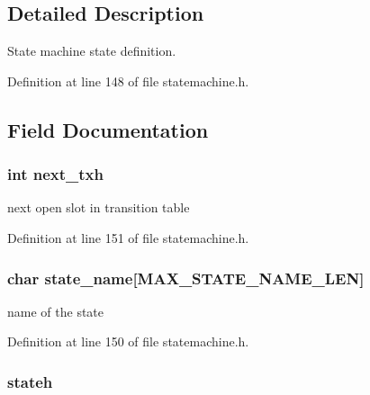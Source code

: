 \subsection{Detailed Description}
State machine state definition. 

Definition at line 148 of file statemachine.\-h.



\subsection{Field Documentation}
\hypertarget{struct__state__struct_a597bbb4fe7a8da9e9c9b9a7bc000df14}{
\subsubsection[{next\-\_\-txh}]{\setlength{\rightskip}{0pt plus 5cm}int next\-\_\-txh}}\label{struct__state__struct_a597bbb4fe7a8da9e9c9b9a7bc000df14}


next open slot in transition table 



Definition at line 151 of file statemachine.\-h.

\hypertarget{struct__state__struct_a6ef692bc2cb17ff774b80d244d265e2a}{
\subsubsection[{state\-\_\-name}]{\setlength{\rightskip}{0pt plus 5cm}char state\-\_\-name\mbox{[}{\bf M\-A\-X\-\_\-\-S\-T\-A\-T\-E\-\_\-\-N\-A\-M\-E\-\_\-\-L\-E\-N}\mbox{]}}}\label{struct__state__struct_a6ef692bc2cb17ff774b80d244d265e2a}


name of the state 



Definition at line 150 of file statemachine.\-h.

\hypertarget{struct__state__struct_afb6173932f6475f5e42df883a40946ea}{
\subsubsection[{stateh}]{ stateh}}\label{struct__state__struct_afb6173932f6475f5e42df883a40946ea}


